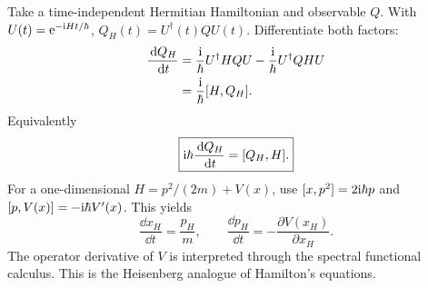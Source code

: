 Take a time-independent Hermitian
Hamiltonian and observable $Q$.
With $U(t)=\mathrm e^{-\mathrm i Ht/\hbar}$,
$Q_H(t)=U^\dagger(t)QU(t)$.
Differentiate both factors:
\begin{align}
\frac{\,\mathrm d Q_H}{\,\mathrm d t}
&=\frac{\mathrm i}{\hbar}U^\dagger HQU
-\frac{\mathrm i}{\hbar}U^\dagger QHU\\
&=\frac{\mathrm i}{\hbar}[H,Q_H].
\end{align}
Equivalently
\begin{equation}
\boxed{\mathrm i\hbar\frac{\,\mathrm d Q_H}{\,\mathrm d t}
=[Q_H,H].}
\end{equation}
For a one-dimensional
$H=p^2/(2m)+V(x)$, use
$[x,p^2]=2\mathrm i\hbar p$ and
$[p,V(x)]=-\mathrm i\hbar V'(x)$.
This yields
\begin{equation}
\boxed{\frac{\dd x_H}{\dd t}=
\frac{p_H}{m},\qquad
\frac{\dd p_H}{\dd t}=
-\frac{\partial V(x_H)}{\partial x_H}.}
\end{equation}
The operator derivative of $V$
is interpreted through the
spectral functional calculus.
This is the Heisenberg analogue
of Hamilton's equations.


